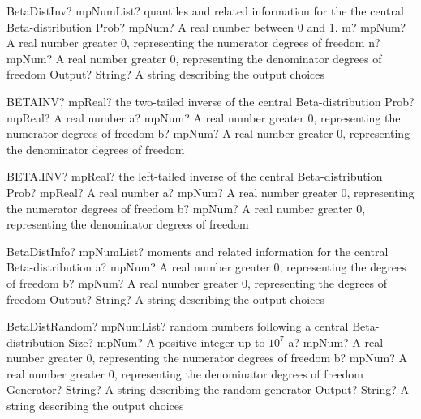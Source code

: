 \documentclass[12pt,a4paper,openany]{book}
\begin{document}
\begin{mpFunctionsExtract}
\mpFunctionFourNotImplemented
{BetaDistInv? mpNumList? quantiles and related information for the the central Beta-distribution}
{Prob? mpNum? A real number between 0 and 1.}
{m? mpNum? A real number greater 0, representing the numerator  degrees of freedom}
{n? mpNum? A real number greater 0, representing the denominator degrees of freedom}
{Output? String? A string describing the output choices}
\end{mpFunctionsExtract}

\begin{mpFunctionsExtract}
\mpWorksheetFunctionThree
{BETAINV? mpReal? the two-tailed inverse of the central Beta-distribution}
{Prob? mpReal? A real number}
{a? mpNum? A real number greater 0, representing the numerator  degrees of freedom}
{b? mpNum? A real number greater 0, representing the denominator degrees of freedom}
\end{mpFunctionsExtract}

\begin{mpFunctionsExtract}
\mpWorksheetFunctionThree
{BETA.INV? mpReal? the left-tailed inverse of the central Beta-distribution}
{Prob? mpReal? A real number}
{a? mpNum? A real number greater 0, representing the numerator  degrees of freedom}
{b? mpNum? A real number greater 0, representing the denominator degrees of freedom}
\end{mpFunctionsExtract}

\begin{mpFunctionsExtract}
\mpFunctionThreeNotImplemented
{BetaDistInfo? mpNumList? moments and related information for the central Beta-distribution}
{a? mpNum? A real number greater 0, representing the degrees of freedom}
{b? mpNum? A real number greater 0, representing the degrees of freedom}
{Output? String? A string describing the output choices}
\end{mpFunctionsExtract}

\begin{mpFunctionsExtract}
\mpFunctionFiveNotImplemented
{BetaDistRandom? mpNumList? random numbers following a central Beta-distribution}
{Size? mpNum? A positive integer up to $10^7$}
{a? mpNum? A real number greater 0, representing the numerator  degrees of freedom}
{b? mpNum? A real number greater 0, representing the denominator degrees of freedom}
{Generator? String? A string describing the random generator}
{Output? String? A string describing the output choices}
\end{mpFunctionsExtract}
\end{document}
